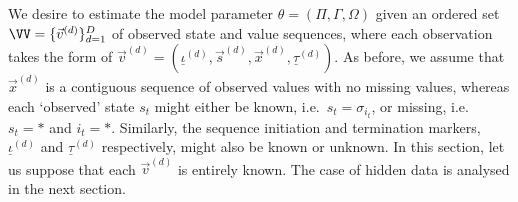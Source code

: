 \documentclass[a4paper]{article}
\begin{document}
We desire to estimate the model parameter $\theta=(\Pi,\Gamma,\Omega)$ given an 
ordered set $\VV=\{\vec{v}^{(d)}\}_{d=1}^{D}$ of observed state and value sequences,
where each observation takes the form of $\vec{v}^{(d)}=(\underline{\iota}^{(d)},\vec{s}^{(d)},\vec{x}^{(d)},\underline{\tau}^{(d)})$.
As before, we assume that $\vec{x}^{(d)}$ is a contiguous sequence of observed values with no missing values, whereas each `observed' state
$s_t$ might either be known, i.e.\ $s_t=\sigma_{i_t}$, or missing, i.e.\ $s_t=*$ and $i_t=*$.
Similarly, the sequence initiation and termination markers, $\underline{\iota}^{(d)}$ and $\underline{\tau}^{(d)}$ respectively,
might also be known or unknown.
In this section, let us suppose that each $\vec{v}^{(d)}$ is entirely known. The case of hidden data is analysed in the next section.
\end{document}
